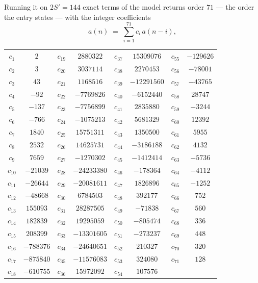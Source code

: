 \documentclass[11pt,a4paper]{article}
\theoremstyle{plain}
\theoremstyle{definition}
\begin{document}
Running it on $2S'=144$ exact terms of the model returns order $71$ --- the order the
entry states --- with the integer coefficients
\[
a(n)\;=\;\sum_{i=1}^{71}c_i\,a(n-i),
\]
\begin{center}\small
\begin{tabular}{cccccccc}
$c_{1}$ & $2$ & $c_{19}$ & $2880322$ & $c_{37}$ & $15309076$ & $c_{55}$ & $-129626$ \\
$c_{2}$ & $3$ & $c_{20}$ & $3037114$ & $c_{38}$ & $2270453$ & $c_{56}$ & $-78001$ \\
$c_{3}$ & $43$ & $c_{21}$ & $1168516$ & $c_{39}$ & $-12291560$ & $c_{57}$ & $-43765$ \\
$c_{4}$ & $-92$ & $c_{22}$ & $-7769826$ & $c_{40}$ & $-6152440$ & $c_{58}$ & $28747$ \\
$c_{5}$ & $-137$ & $c_{23}$ & $-7756899$ & $c_{41}$ & $2835880$ & $c_{59}$ & $-3244$ \\
$c_{6}$ & $-766$ & $c_{24}$ & $-1075213$ & $c_{42}$ & $5681329$ & $c_{60}$ & $12392$ \\
$c_{7}$ & $1840$ & $c_{25}$ & $15751311$ & $c_{43}$ & $1350500$ & $c_{61}$ & $5955$ \\
$c_{8}$ & $2532$ & $c_{26}$ & $14625731$ & $c_{44}$ & $-3186188$ & $c_{62}$ & $4132$ \\
$c_{9}$ & $7659$ & $c_{27}$ & $-1270302$ & $c_{45}$ & $-1412414$ & $c_{63}$ & $-5736$ \\
$c_{10}$ & $-21039$ & $c_{28}$ & $-24233380$ & $c_{46}$ & $-178364$ & $c_{64}$ & $-4112$ \\
$c_{11}$ & $-26644$ & $c_{29}$ & $-20081611$ & $c_{47}$ & $1826896$ & $c_{65}$ & $-1252$ \\
$c_{12}$ & $-48668$ & $c_{30}$ & $6784503$ & $c_{48}$ & $392177$ & $c_{66}$ & $752$ \\
$c_{13}$ & $155093$ & $c_{31}$ & $28287505$ & $c_{49}$ & $-71838$ & $c_{67}$ & $560$ \\
$c_{14}$ & $182839$ & $c_{32}$ & $19295059$ & $c_{50}$ & $-805474$ & $c_{68}$ & $336$ \\
$c_{15}$ & $208399$ & $c_{33}$ & $-13301605$ & $c_{51}$ & $-273237$ & $c_{69}$ & $448$ \\
$c_{16}$ & $-788376$ & $c_{34}$ & $-24640651$ & $c_{52}$ & $210327$ & $c_{70}$ & $320$ \\
$c_{17}$ & $-875840$ & $c_{35}$ & $-11576083$ & $c_{53}$ & $324080$ & $c_{71}$ & $128$ \\
$c_{18}$ & $-610755$ & $c_{36}$ & $15972092$ & $c_{54}$ & $107576$ &  &  \\
\end{tabular}
\end{center}
\end{document}
